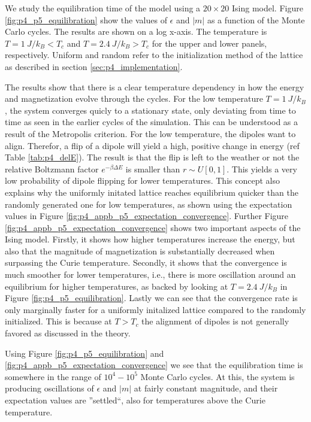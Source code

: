 \documentclass[../main_proj4_correct_template.tex]{subfiles}
\begin{document}
We study the equilibration time of the model using a $20\times 20$ Ising model. Figure \ref{fig:p4_p5_equilibration} show the values of $\epsilon$ and $|m|$ as a function of the Monte Carlo cycles. The results are shown on a log x-axis. The temperature is $T=1~J/k_B < T_c$ and $T=2.4~J/k_B > T_c$ for the upper and lower panels, respectively. Uniform and random refer to the initialization method of the lattice as described in section \ref{sec:p4_implementation}. 



The results show that there is a clear temperature dependency in how the energy and magnetization evolve through the cycles. For the low temperature $T=1~J/k_B$, the system converges quicly to a stationary state, only deviating from time to time as seen in the earlier cycles of the simulation. This can be understood as a result of the Metropolis criterion. For the low temperature, the dipoles want to align. Therefor, a flip of a dipole will yield a high, positive change in energy (ref Table \ref{tab:p4_delE}). The result is that the flip is left to the weather or not the relative Boltzmann factor $e^{-\beta \Delta E}$ is smaller than $r\sim U[0,1]$. This yields a very low probability of dipole flipping for lower temperatures. This concept also explains why the uniformly initated lattice reaches equilibrium quicker than the randomly generated one for low temperatures, as shown using the expectation values in Figure \ref{fig:p4_appb_p5_expectation_convergence}. Further Figure \ref{fig:p4_appb_p5_expectation_convergence} shows two important aspects of the Ising model. Firstly, it shows how higher temperatures increase the energy, but also that the magnitude of magnetization is substantially decreased when surpassing the Curie temperature. Secondly, it shows that the convergence is much smoother for lower temperatures, i.e., there is more oscillation around an equilibrium for higher temperatures, as backed by looking at $T=2.4~J/k_B$ in Figure \ref{fig:p4_p5_equilibration}. Lastly we can see that the convergence rate is only marginally faster for a uniformly initalized lattice compared to the randomly initialized. This is because at $T>T_c$ the alignment of dipoles is not generally favored as discussed in the theory.

Using Figure \ref{fig:p4_p5_equilibration} and \ref{fig:p4_appb_p5_expectation_convergence} we see that the equilibration time is somewhere in the range of $10^{4}-10^{5}$ Monte Carlo cycles. At this, the system is producing oscillations of $\epsilon$ and $|m|$ at fairly constant magnitude, and their expectation values are ''settled``, also for temperatures above the Curie temperature.
\end{document}
